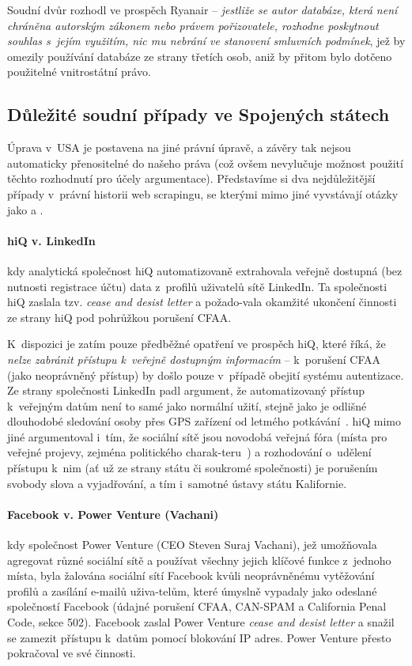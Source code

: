 \documentclass[thesis=B,czech]{FITthesis}[2012/06/26]
\begin{document}
Soudní dvůr rozhodl ve prospěch Ryanair -- \emph{jestliže se autor databáze, která není chráněna autorským zákonem nebo právem pořizovatele, rozhodne poskytnout souhlas s~jejím využitím, nic mu nebrání ve stanovení smluvních podmínek}, jež by omezily používání databáze ze strany třetích osob, aniž by přitom bylo dotčeno použitelné vnitrostátní právo.~\cite{C-30/14}

\subsection{Důležité soudní případy ve Spojených státech}
Úprava v USA je postavena na jiné právní úpravě, a závěry tak nejsou automaticky přenositelné do našeho práva (což ovšem nevylučuje možnost použití těchto rozhodnutí pro účely argumentace). Představíme si dva nejdůležitější případy v~právní historii web scrapingu, se kterými mimo jiné vyvstávají otázky jako  a .

\paragraph{hiQ v. LinkedIn} kdy analytická společnost hiQ automatizovaně extrahovala veřejně dostupná (bez nutnosti registrace účtu) data z~profilů uživatelů sítě LinkedIn. Ta společnosti hiQ zaslala tzv. \textit{cease and desist letter} a požado-vala okamžité ukončení činnosti ze strany hiQ pod pohrůžkou porušení CFAA. \cite{hiq_linkedin_1}

K~dispozici je zatím pouze předběžné opatření ve prospěch hiQ, které říká, že \textit{nelze zabránit přístupu k~veřejně dostupným informacím} -- k~porušení CFAA (jako neoprávněný přístup) by došlo pouze v~případě obejití systému autentizace. Ze strany společnosti LinkedIn padl argument, že automatizovaný přístup k~veřejným datům není to samé jako normální  užití, stejně jako je odlišné dlouhodobé sledování osoby přes GPS zařízení od letmého potkávání~\cite{linkedin_arg}. hiQ mimo jiné argumentoval i~tím, že sociální sítě jsou novodobá veřejná fóra (místa pro veřejné projevy, zejména politického charak-teru~\cite{public_forum}) a rozhodování o~udělení přístupu k~nim (ať už ze strany státu či soukromé společnosti) je porušením svobody slova a vyjadřování, a tím i~samotné ústavy státu Kalifornie.~\cite{hiq_linkedin_2}

\paragraph{Facebook v. Power Venture (Vachani)} kdy společnost Power Venture (CEO Steven Suraj Vachani), jež umožňovala agregovat různé sociální sítě a používat všechny jejich klíčové funkce z~jednoho místa, byla žalována sociální sítí Facebook kvůli neoprávněnému vytěžování profilů a zasílání e-mailů uživa-telům, které úmyslně vypadaly jako odeslané společností Facebook (údajné porušení CFAA, CAN-SPAM a California Penal Code, sekce 502). Facebook zaslal Power Venture \textit{cease and desist letter} a snažil se zamezit přístupu k~datům pomocí blokování IP adres. Power Venture přesto pokračoval ve své činnosti.~\cite{facebook_venture_1}
\end{document}

